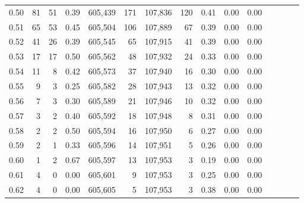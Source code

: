 \begin{tabular}{rrrcrrrrrrrrrrr}
0.50 &      81 &     51 &                                       0.39 &  605,439 &      171 &  107,836 &      120 &  0.41 &  0.00 &                         0.00 \\
0.51 &      65 &     53 &                                       0.45 &  605,504 &      106 &  107,889 &       67 &  0.39 &  0.00 &                         0.00 \\
0.52 &      41 &     26 &                                       0.39 &  605,545 &       65 &  107,915 &       41 &  0.39 &  0.00 &                         0.00 \\
0.53 &      17 &     17 &                                       0.50 &  605,562 &       48 &  107,932 &       24 &  0.33 &  0.00 &                         0.00 \\
0.54 &      11 &      8 &                                       0.42 &  605,573 &       37 &  107,940 &       16 &  0.30 &  0.00 &                         0.00 \\
0.55 &       9 &      3 &                                       0.25 &  605,582 &       28 &  107,943 &       13 &  0.32 &  0.00 &                         0.00 \\
0.56 &       7 &      3 &                                       0.30 &  605,589 &       21 &  107,946 &       10 &  0.32 &  0.00 &                         0.00 \\
0.57 &       3 &      2 &                                       0.40 &  605,592 &       18 &  107,948 &        8 &  0.31 &  0.00 &                         0.00 \\
0.58 &       2 &      2 &                                       0.50 &  605,594 &       16 &  107,950 &        6 &  0.27 &  0.00 &                         0.00 \\
0.59 &       2 &      1 &                                       0.33 &  605,596 &       14 &  107,951 &        5 &  0.26 &  0.00 &                         0.00 \\
0.60 &       1 &      2 &                                       0.67 &  605,597 &       13 &  107,953 &        3 &  0.19 &  0.00 &                         0.00 \\
0.61 &       4 &      0 &                                       0.00 &  605,601 &        9 &  107,953 &        3 &  0.25 &  0.00 &                         0.00 \\
0.62 &       4 &      0 &                                       0.00 &  605,605 &        5 &  107,953 &        3 &  0.38 &  0.00 &                         0.00 \\

\end{tabular}
